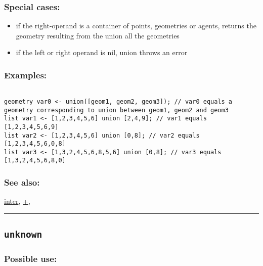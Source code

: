 \documentclass[]{book}
\providecommand{\tightlist}{%
  \setlength{\itemsep}{0pt}\setlength{\parskip}{0pt}}
\theoremstyle{definition}
\theoremstyle{definition}
\theoremstyle{definition}
\theoremstyle{remark}
\begin{document}
\subsubsection{Special cases:}\label{special-cases-142}

\begin{itemize}
\tightlist
\item
  if the right-operand is a container of points, geometries or agents,
  returns the geometry resulting from the union all the geometries\\
\item
  if the left or right operand is nil, union throws an error
\end{itemize}

\subsubsection{Examples:}\label{examples-373}

\begin{verbatim}
 
geometry var0 <- union([geom1, geom2, geom3]); // var0 equals a geometry corresponding to union between geom1, geom2 and geom3 
list var1 <- [1,2,3,4,5,6] union [2,4,9]; // var1 equals [1,2,3,4,5,6,9] 
list var2 <- [1,2,3,4,5,6] union [0,8]; // var2 equals [1,2,3,4,5,6,0,8] 
list var3 <- [1,3,2,4,5,6,8,5,6] union [0,8]; // var3 equals [1,3,2,4,5,6,8,0]
\end{verbatim}

\subsubsection{See also:}\label{see-also-214}

\href{OperatorsIM\#inter}{inter}, \href{OperatorsAA\#+}{+},

\begin{center}\rule{0.5\linewidth}{\linethickness}\end{center}

\subsection{\texorpdfstring{\texttt{unknown}}{unknown}}\label{unknown}

\subsubsection{Possible use:}\label{possible-use-539}
\end{document}
